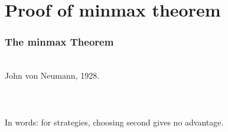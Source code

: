 \documentclass[handout]{beamer}
\begin{document}



\section{Proof of minmax theorem}

\begin{frame}
\frametitle{The minmax Theorem}
~\\
John von Neumann, 1928.
\\ ~ \\ \pause
\R{\[ \minp \maxq \mpq = \maxq \minp \mpq \]}
\\ ~ \\ \pause
In words: for  strategies, choosing second gives no advantage.
\end{frame}
\end{document}
